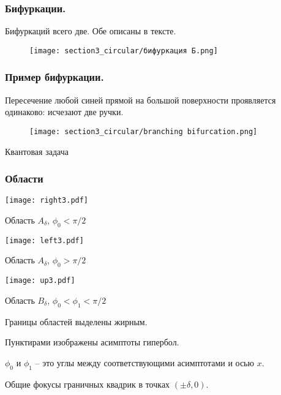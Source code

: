 \begin{frame}\frametitle{Бифуркации.}
\qq Бифуркаций всего две. Обе описаны в тексте. 
\begin{figure}
    \centering
    \texttt{[image: section3\_circular/бифуркация Б.png]}
\end{figure}
\end{frame}

\begin{frame}\frametitle{Пример бифуркации.}
\qq Пересечение любой синей прямой на большой поверхности проявляется одинаково: исчезают две ручки.

\begin{figure}
    \centering
    \texttt{[image: section3\_circular/branching bifurcation.png]}
    
\end{figure}

\end{frame}

\begin{frame}
\center\LARGE Квантовая задача
\end{frame}


\begin{frame}\frametitle{Области}

\begin{minipage}{\linewidth}
\begin{minipage}{0.31\linewidth}
\texttt{[image: right3.pdf]}

\small Область $A_\delta$, $\phi_0<\pi/2$
\end{minipage}
\begin{minipage}{0.31\linewidth}
\texttt{[image: left3.pdf]}

\small Область $A_\delta$, $\phi_0>\pi/2$
\end{minipage}
\begin{minipage}{0.31\linewidth}
\texttt{[image: up3.pdf]}

\small Область $B_\delta$, $\phi_0<\phi_1<\pi/2$
\end{minipage}
\bigskip
\bigskip\bigskip

\centerline{  Границы областей выделены жирным.}
\centerline{Пунктирами изображены асимптоты гипербол.}
\centerline{ $\phi_0$ и $\phi_1$ -- это углы между соответствующими асимптотами и осью $x$.}
\centerline{Общие фокусы граничных квадрик в точках $(\pm \delta, 0)$.}
\end{minipage}

\end{frame}

